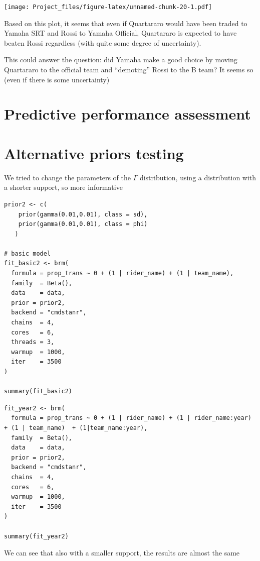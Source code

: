 \documentclass[
]{article}
\begin{document}
\texttt{[image: Project\_files/figure-latex/unnamed-chunk-20-1.pdf]}

Based on this plot, it seems that even if Quartararo would have been
traded to Yamaha SRT and Rossi to Yamaha Official, Quartararo is
expected to have beaten Rossi regardless (with quite some degree of
uncertainty).

This could answer the question: did Yamaha make a good choice by moving
Quartararo to the official team and ``demoting'' Rossi to the B team? It
seems so (even if there is some uncertainty)

\hypertarget{predictive-performance-assessment}{%
\section{Predictive performance
assessment}\label{predictive-performance-assessment}}

\hypertarget{alternative-priors-testing}{%
\section{Alternative priors testing}\label{alternative-priors-testing}}

We tried to change the parameters of the \(\Gamma\) distribution, using
a distribution with a shorter support, so more informative

\begin{verbatim}
prior2 <- c(
    prior(gamma(0.01,0.01), class = sd),
    prior(gamma(0.01,0.01), class = phi)
   )

# basic model
fit_basic2 <- brm(
  formula = prop_trans ~ 0 + (1 | rider_name) + (1 | team_name),
  family  = Beta(),
  data    = data,
  prior = prior2,
  backend = "cmdstanr",
  chains  = 4,
  cores   = 6,
  threads = 3,
  warmup  = 1000,
  iter    = 3500
)

summary(fit_basic2)
\end{verbatim}

\begin{verbatim}
fit_year2 <- brm(
  formula = prop_trans ~ 0 + (1 | rider_name) + (1 | rider_name:year) + (1 | team_name)  + (1|team_name:year),
  family  = Beta(),
  data    = data,
  prior = prior2,
  backend = "cmdstanr",
  chains  = 4,
  cores   = 6,
  warmup  = 1000,
  iter    = 3500
)

summary(fit_year2)
\end{verbatim}

We can see that also with a smaller support, the results are almost the
same
\end{document}
